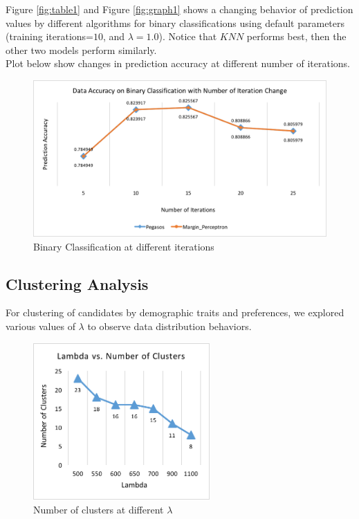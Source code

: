 \documentclass[11pt,letterpaper]{article}
\begin{document}
Figure \ref{fig:table1} and Figure \ref{fig:graph1} shows a changing behavior of prediction values by different algorithms for binary classifications using default parameters (training iterations=$10$, and $\lambda=1.0$). Notice that $KNN$ performs best, then the other two models perform similarly.\\

Plot below show changes in prediction accuracy at different number of iterations.

\begin{figure}
  \includegraphics[width=\linewidth]{Normal_Prediction_Accuracy_with_Interation.png}
  \caption{Binary Classification at different iterations}
  \label{fig:table2}
\end{figure}

\pagebreak

\subsection{Clustering Analysis}

For clustering of candidates by demographic traits and preferences, we explored various values of $\lambda$ to observe data distribution behaviors.

\begin{figure}
  \includegraphics[width=\linewidth,height=6cm]{2_lamba_vs_cluster.png}
  \caption{Number of clusters at different $\lambda$}
  \label{fig:graph2}
\end{figure}
\end{document}
